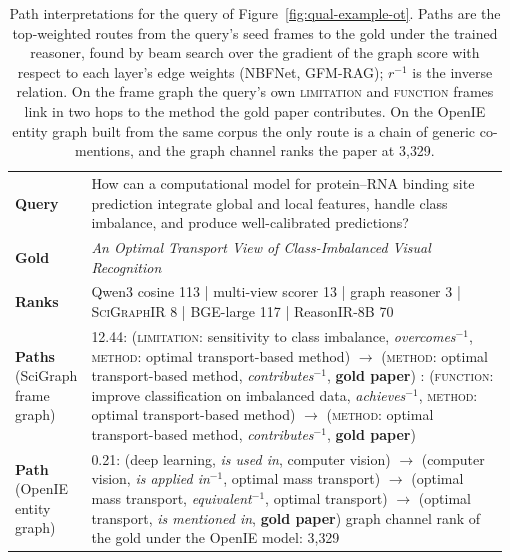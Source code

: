 \begin{table}[t]
\centering
\resulttablestyle
\setlength{\tabcolsep}{5pt}
\renewcommand{\arraystretch}{1.25}
\begin{tabular}{@{}p{0.13\linewidth} p{0.85\linewidth}@{}}
\toprule
\textbf{Query} & How can a computational model for protein--RNA binding site prediction integrate global and
local features, handle class imbalance, and produce well-calibrated predictions? \\
\textbf{Gold} & \emph{An Optimal Transport View of Class-Imbalanced Visual Recognition} \\
\textbf{Ranks} & Qwen3 cosine 113 \;|\; multi-view scorer 13 \;|\; graph reasoner 3 \;|\; \textsc{SciGraphIR} 8
\;|\; BGE-large 117 \;|\; ReasonIR-8B 70 \\
\midrule
\textbf{Paths} \newline (SciGraph frame graph) &
12.44:\; (\textsc{limitation}: sensitivity to class imbalance,\; \textit{overcomes}$^{-1}$,\;
\textsc{method}: optimal transport-based method) $\rightarrow$
(\textsc{method}: optimal transport-based method,\; \textit{contributes}$^{-1}$,\; \textbf{gold paper}) \newline
11.31:\; (\textsc{function}: improve classification on imbalanced data,\; \textit{achieves}$^{-1}$,\;
\textsc{method}: optimal transport-based method) $\rightarrow$
(\textsc{method}: optimal transport-based method,\; \textit{contributes}$^{-1}$,\; \textbf{gold paper}) \\
\addlinespace
\textbf{Path} \newline (OpenIE entity graph) &
0.21:\; (deep learning,\; \textit{is used in},\; computer vision) $\rightarrow$
(computer vision,\; \textit{is applied in}$^{-1}$,\; optimal mass transport) $\rightarrow$
(optimal mass transport,\; \textit{equivalent}$^{-1}$,\; optimal transport) $\rightarrow$
(optimal transport,\; \textit{is mentioned in},\; \textbf{gold paper}) \newline
{\footnotesize graph channel rank of the gold under the OpenIE model: 3{,}329} \\
\bottomrule
\end{tabular}
\caption{Path interpretations for the query of Figure~\ref{fig:qual-example-ot}. Paths are the top-weighted
routes from the query's seed frames to the gold under the trained reasoner, found by beam search over the
gradient of the graph score with respect to each layer's edge weights (NBFNet, GFM-RAG); $r^{-1}$ is the inverse
relation. On the frame graph the query's own \textsc{limitation} and \textsc{function} frames link in two hops to the
method the gold paper contributes. On the OpenIE entity graph built from the same corpus the only route is a chain
of generic co-mentions, and the graph channel ranks the paper at 3{,}329.}
\label{tab:path-interpretations}
\end{table}
